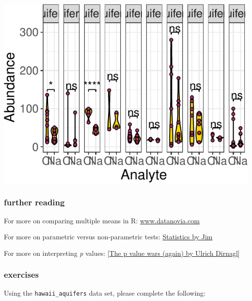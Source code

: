 \documentclass[
]{krantz}
\begin{document}
\begin{center}\includegraphics[width=0.8\linewidth]{index_files/figure-latex/unnamed-chunk-159-1} \end{center}

\hypertarget{further-reading}{%
\subsubsection{further reading}\label{further-reading}}

For more on comparing multiple means in R: \href{https://www.datanovia.com/en/courses/comparing-multiple-means-in-r/}{www.datanovia.com}

For more on parametric versus non-parametric tests: \href{https://statisticsbyjim.com/hypothesis-testing/nonparametric-parametric-tests/}{Statistics by Jim}

For more on interpreting \emph{p} values: {[}\href{https://link.springer.com/article/10.1007/s00259-019-04467-5}{The p value wars (again) by Ulrich Dirnagl}{]}

\hypertarget{exercises-7}{%
\subsubsection{exercises}\label{exercises-7}}

Using the \texttt{hawaii\_aquifers} data set, please complete the following:
\end{document}
